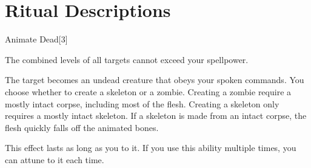 \section{Ritual Descriptions}

\begin{spellsection}{Animate Dead}[3]

\begin{spellheader}
\end{spellheader}

\begin{spellcontent}

\begin{spelltargetinginfo}
\spellspecial The combined levels of all targets cannot exceed your spellpower.


\end{spelltargetinginfo}


\begin{spelleffects}



\spelleffect
The target becomes an undead creature that obeys your spoken commands.
You choose whether to create a skeleton or a zombie.
Creating a zombie require a mostly intact corpse, including most of the flesh.
Creating a skeleton only requires a mostly intact skeleton.
If a skeleton is made from an intact corpse, the flesh quickly falls off the animated bones.

This effect lasts as long as you  to it.
If you use this ability multiple times, you can attune to it each time.








\end{spelleffects}

\end{spellcontent}
\begin{spellfooter}


\end{spellfooter}
\begin{spellsubcontent}


\end{spellsubcontent}
\end{spellsection}


